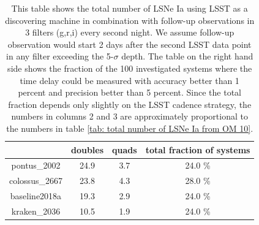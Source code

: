 \begin{table}
\centering
\begin{tabular}{c|c|c|c}
& doubles & quads & total fraction of systems \\
\hline
pontus\_2002 & 24.9 & 3.7 & 24.0 \% \\
\hline
colossus\_2667 & 23.8 &4.3 & 28.0 \%  \\
\hline
baseline2018a & 19.3 & 2.9 & 24.0 \%  \\
\hline
kraken\_2036 & 10.5 & 1.9 & 24.0 \% \\
\end{tabular}
\caption{This table shows the total number of LSNe Ia using LSST as a discovering machine in combination with follow-up observations in 3 filters (g,r,i) every second night. We assume follow-up observation would start 2 days after the second LSST data point in any filter exceeding the 5-$\sigma$ depth. The table on the right hand side shows the fraction of the 100 investigated systems where the time delay could be measured with accuracy better than 1 percent and precision better than 5 percent. Since the total fraction depends only slightly on the LSST cadence strategy, the numbers in columns 2 and 3 are approximately proportional to the numbers in table \ref{tab: total number of LSNe Ia from OM 10}. }
\label{tab: follow up and number of LSNe Ia}
\end{table}
%
